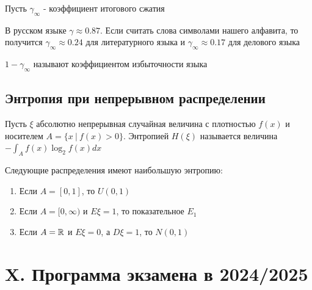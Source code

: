 \documentclass[12pt]{article}
\begin{document}
Пусть $\gamma_\infty$ - коэффициент итогового сжатия


В русском языке $\gamma \approx 0.87$. Если считать слова символами нашего алфавита, 
то получится $\gamma_\infty \approx 0.24$ для литературного языка и
$\gamma_\infty \approx 0.17$ для делового языка

\Def $1 - \gamma_\infty$ называют коэффициентом избыточности языка

\subsection{Энтропия при непрерывном распределении}

\Def Пусть $\xi$ абсолютно непрерывная случайная величина с плотностью $f(x)$ и носителем $A = \{x \ | \ f(x) > 0\}$. Энтропией $H(\xi)$ называется
величина $-\int_A f(x) \log_2 f(x) dx$

\begin{MyTheorem}
    \Ths Следующие распределения имеют наибольшую энтропию:

    \begin{enumerate}
        \item Если $A = [0, 1]$, то $U(0, 1)$

        \item Если $A = [0, \infty)$ и $E\xi = 1$, то показательное $E_1$

        \item Если $A = \mathbb{R}$ и $E\xi = 0$, а $D\xi = 1$, то $N(0, 1)$
    \end{enumerate}
\end{MyTheorem}

\clearpage

\section{X. Программа экзамена в 2024/2025}
\end{document}
